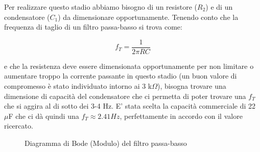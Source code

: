 \documentclass[12pt,a4paper]{article}
\begin{document}
        Per realizzare questo stadio abbiamo bisogno di un resistore ($R_2$) e di un condensatore ($C_1$) da dimensionare opportunamente.
        Tenendo conto che la frequenza di taglio di un filtro passa-basso si trova come:

        \begin{equation}
            \boxed{f_T = \frac{1}{2\pi RC}}
        \end{equation}

        e che la resistenza deve essere dimensionata opportunamente per non limitare o aumentare troppo la corrente passante in questo stadio
        (un buon valore di compromesso è stato individuato intorno ai 3 k$\Omega$), bisogna trovare una dimensione di capacità del condensatore
        che ci permetta di poter trovare una $f_T$ che si aggira al di sotto dei 3-4 Hz. E' stata scelta la capacità commerciale di 22 $\mu$F che ci dà quindi
        una $f_T \approx 2.41 Hz$, perfettamente in accordo con il valore ricercato.

        \begin{figure}[H]
        \centering
        
        \captionsetup{justification=centering, singlelinecheck=false, font=small}
        \caption{Diagramma di Bode (Modulo) del filtro passa-basso}
        \label{fig:bode_passabasso_modulo}
        \end{figure}
    
\end{document}
